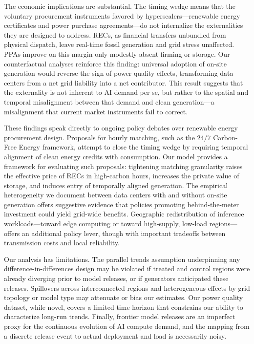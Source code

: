 \documentclass[a4paper,fleqn,longmktitle]{cas-sc}
\begin{document}
The economic implications are substantial. The timing wedge means that the voluntary procurement instruments favored by hyperscalers---renewable energy certificates and power purchase agreements---do not internalize the externalities they are designed to address. RECs, as financial transfers unbundled from physical dispatch, leave real-time fossil generation and grid stress unaffected. PPAs improve on this margin only modestly absent firming or storage. Our counterfactual analyses reinforce this finding: universal adoption of on-site generation would reverse the sign of power quality effects, transforming data centers from a net grid liability into a net contributor. This result suggests that the externality is not inherent to AI demand per se, but rather to the spatial and temporal misalignment between that demand and clean generation---a misalignment that current market instruments fail to correct.

These findings speak directly to ongoing policy debates over renewable energy procurement design. Proposals for hourly matching, such as the 24/7 Carbon-Free Energy framework, attempt to close the timing wedge by requiring temporal alignment of clean energy credits with consumption. Our model provides a framework for evaluating such proposals: tightening matching granularity raises the effective price of RECs in high-carbon hours, increases the private value of storage, and induces entry of temporally aligned generation. The empirical heterogeneity we document between data centers with and without on-site generation offers suggestive evidence that policies promoting behind-the-meter investment could yield grid-wide benefits. Geographic redistribution of inference workloads---toward edge computing or toward high-supply, low-load regions---offers an additional policy lever, though with important tradeoffs between transmission costs and local reliability.

Our analysis has limitations. The parallel trends assumption underpinning any difference-in-differences design may be violated if treated and control regions were already diverging prior to model releases, or if generators anticipated these releases. Spillovers across interconnected regions and heterogeneous effects by grid topology or model type may attenuate or bias our estimates. Our power quality dataset, while novel, covers a limited time horizon that constrains our ability to characterize long-run trends. Finally, frontier model releases are an imperfect proxy for the continuous evolution of AI compute demand, and the mapping from a discrete release event to actual deployment and load is necessarily noisy.
\end{document}

